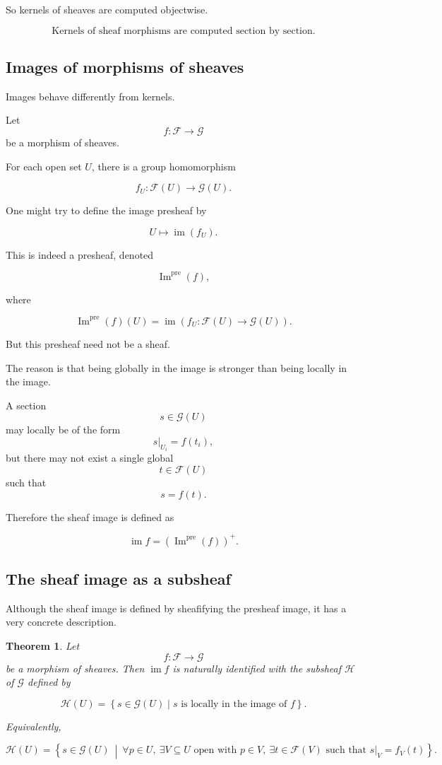 \documentclass[12pt,a4paper]{article}
\DeclareMathOperator{\im}{im}
\theoremstyle{notespace}
\newtheorem{theorem}[definition]{Theorem}
\begin{document}
So kernels of sheaves are computed objectwise.

\[
\boxed{
	\text{Kernels of sheaf morphisms are computed section by section.}
}
\]

\subsection{Images of morphisms of sheaves}
Images behave differently from kernels.

Let
\[
f:\mathcal F \longrightarrow \mathcal G
\]
be a morphism of sheaves.

For each open set $U$, there is a group homomorphism

\[
f_U:\mathcal F(U)\to\mathcal G(U).
\]

One might try to define the image presheaf by

\[
U \longmapsto \im(f_U).
\]

This is indeed a presheaf, denoted

\[
\operatorname{Im}^{\operatorname{pre}}(f),
\]

where

\[
\operatorname{Im}^{\operatorname{pre}}(f)(U)
=
\im
\left(
f_U:\mathcal F(U)\to\mathcal G(U)
\right).
\]

But this presheaf need not be a sheaf.

The reason is that being globally in the image is stronger than being locally
in the image.

A section
\[
s \in \mathcal G(U)
\]
may locally be of the form
\[
s|_{U_i}=f(t_i),
\]
but there may not exist a single global
\[
t \in \mathcal F(U)
\]
such that
\[
s=f(t).
\]

Therefore the sheaf image is defined as

\[
\im f
=
\left(
\operatorname{Im}^{\operatorname{pre}}(f)
\right)^+.
\]

\subsection{The sheaf image as a subsheaf}
Although the sheaf image is defined by sheafifying the presheaf image, it has
a very concrete description.

\begin{theorem}
	Let
	\[
	f:\mathcal F \longrightarrow \mathcal G
	\]
	be a morphism of sheaves.
	Then $\im f$ is naturally identified with the subsheaf $\mathcal H$ of
	$\mathcal G$ defined by
	
	\[
	\mathcal H(U)
	=
	\left\{
	s \in \mathcal G(U)
	\mid
	s \text{ is locally in the image of } f
	\right\}.
	\]
	
	Equivalently,
	
	\[
	\mathcal H(U)
	=
	\left\{
	s \in \mathcal G(U)
	\ \middle|\
	\forall p \in U,\ \exists V \subseteq U \text{ open with } p \in V,
	\ \exists t \in \mathcal F(V)
	\text{ such that } s|_V=f_V(t)
	\right\}.
	\]
\end{theorem}
\end{document}
